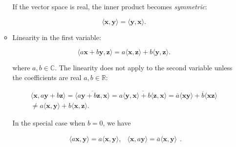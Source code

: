 \documentclass[10pt,b5paper,titlepage]{book}
\begin{document}
\begin{itemize}
\begin{itemize}
                If the vector space is real, the inner product becomes \textit{symmetric}:

                \begin{equation}
                    \langle \mathbf{x}, \mathbf{y} \rangle
                    = \langle \mathbf{y}, \mathbf{x} \rangle
                .\end{equation}

            \item Linearity in the first variable:

                \begin{equation}
                    \langle a \mathbf{x} + b \mathbf{y}, \mathbf{z} \rangle
                    = a \langle \mathbf{x}, \mathbf{z} \rangle
                    + b \langle \mathbf{y}, \mathbf{z} \rangle
                .\end{equation}

                where $a, b \in \mathbb{C}$. The linearity does not apply
                to the second variable unless the coefficients are real
                $a, b \in \mathbb{R}$:

                \begin{equation}
                    \begin{array}{l}
                        \langle \mathbf{x}, a \mathbf{y} + b \mathbf{z} \rangle
                        = \overline{\langle a \mathbf{y} + b \mathbf{z}, \mathbf{x} \rangle}
                        = \overline{a \langle \mathbf{y}, \mathbf{x} \rangle + b \langle \mathbf{z}, \mathbf{x} \rangle}
                        = \overline{a} \langle \mathbf{x} \mathbf{y} \rangle
                        + \overline{b} \langle \mathbf{x} \mathbf{z} \rangle \\
                        \neq a \langle \mathbf{x}, \mathbf{y} \rangle
                        + b \langle \mathbf{x}, \mathbf{z} \rangle.
                    \end{array}
                \end{equation}

                In the special case when $b=0$, we have

                \begin{equation}
                    \begin{array}{lr}
                        \langle a \mathbf{x}, \mathbf{y} \rangle
                        = a \langle \mathbf{x}, \mathbf{y} \rangle, &
                        \langle \mathbf{x}, a \mathbf{y} \rangle
                        = \overline{a} \langle \mathbf{x}, \mathbf{y} \rangle
                    \end{array}
                .\end{equation}


\end{itemize}
\end{itemize}
\end{document}
